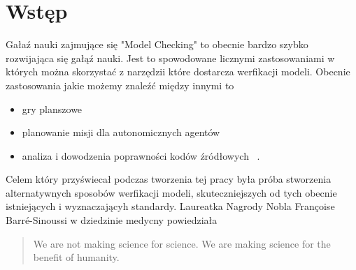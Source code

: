 
\chapter{Wstęp}


Gałaź nauki zajmujące się "Model Checking" to obecnie bardzo szybko rozwijająca się gałąź nauki.
Jest to spowodowane licznymi zastosowaniami w których można skorzystać z narzędzii które dostarcza 
werfikacji modeli. Obecnie zastosowania jakie możemy znaleźć między innymi to
\begin{itemize}
    \item gry planszowe  ~\cite{Schlingloff}%
    \item planowanie misji dla autonomicznych agentów ~\cite{Gu}
    \item analiza i dowodzenia poprawności kodów źródłowych  ~\cite{Amazon}.
\end{itemize}

Celem który przyświecał podczas tworzenia tej pracy była próba stworzenia alternatywnych sposobów werfikacji 
modeli, skuteczniejszych od tych obecnie istniejących i wyznaczającyh standardy. Laureatka Nagrody 
Nobla Françoise Barré-Sinoussi w dziedzinie medycny powiedziała
\begin{quote}
    We are not making science for science. We are making science for the benefit of humanity.
    \end{quote}


